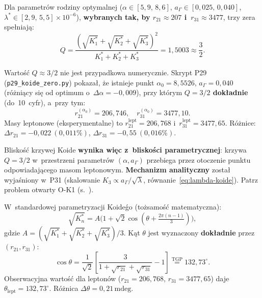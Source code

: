 \begin{hypothesis}%
\label{hyp:koide-tgp}
Dla parametr\'ow rodziny optymalnej
($\alpha \in [5{,}9,\,8{,}6]$, $a_\Gamma \in [0{,}025,\,0{,}040]$,
$\lambda^* \in [2{,}9,\,5{,}5]\!\times\!10^{-6}$),
\textbf{wybranych tak, by $r_{21} \approx 207$ i~$r_{31} \approx 3477$},
trzy zera spe\l{}niaj\k{a}:
\begin{equation}\label{eq:koide-Q}
    Q = \frac{(\sqrt{K^*_1}+\sqrt{K^*_2}+\sqrt{K^*_3})^2}
             {K^*_1+K^*_2+K^*_3}
    = 1{,}5003 \approx \frac{3}{2}.
\end{equation}

\begin{remark}
Warto\'s\'c $Q \approx 3/2$ nie jest przypadkowa numerycznie.
Skrypt P29 (\texttt{p29\_koide\_zero.py}) pokaza\l{}, \.ze
istnieje punkt $\alpha_0 = 8{,}5526$, $a_\Gamma=0{,}040$
(r\'o\.zni\k{a}cy si\k{e} od optimum o~$\Delta\alpha = -0{,}009$),
przy kt\'orym \textbf{$Q = 3/2$ dok\l{}adnie} (do~10~cyfr), a~przy tym:
\begin{equation}\label{eq:r-at-alpha0}
    r_{21}^{(\alpha_0)} = 206{,}746, \quad r_{31}^{(\alpha_0)} = 3477{,}10.
\end{equation}
Masy leptonowe (eksperymentalne) to
$r_{21}^{\mathrm{lept}} = 206{,}768$ i~$r_{31}^{\mathrm{lept}} = 3477{,}65$.
R\'o\.znice: $\Delta r_{21} = -0{,}022\ (0{,}011\%)$,
$\Delta r_{31} = -0{,}55\ (0{,}016\%)$.

Blisko\'s\'c krzywej Koide \textbf{wynika wi\k{e}c z~blisko\'sci
parametrycznej}: krzywa $Q=3/2$ w~przestrzeni parametr\'ow
$(\alpha, a_\Gamma)$ przebiega przez otoczenie punktu
odpowiadaj\k{a}cego masom leptonowym.
\textbf{Mechanizm analityczny} zosta\l{} wyja\'sniony w~P31
(skalowanie $K_3 \propto a_\Gamma/\sqrt{\lambda}$, r\'ownanie~\eqref{eq:lambda-koide}).
Patrz problem otwarty O-K1 (s.~\pageref{oprob:koide}).
\end{remark}

W~standardowej parametryzacji Koide\'go (to\.zsamo\'s\'c matematyczna):
\begin{equation}\label{eq:koide-param}
    \sqrt{K^*_n} = A\bigl(1 + \sqrt{2}\cos(\theta + \tfrac{2\pi(n-1)}{3})\bigr),
\end{equation}
gdzie $A = (\sqrt{K^*_1}+\sqrt{K^*_2}+\sqrt{K^*_3})/3$.
K\k{a}t $\theta$ jest wyznaczony \textbf{dok\l{}adnie} przez $(r_{21}, r_{31})$:
\begin{equation}\label{eq:theta-exact}
    \cos\theta = \frac{1}{\sqrt{2}}
    \left[\frac{3}{1+\sqrt{r_{21}}+\sqrt{r_{31}}} - 1\right]
    \overset{\mathrm{TGP}}{=} 132{,}73^\circ.
\end{equation}
Obserwacyjna warto\'s\'c dla lepton\'ow ($r_{21} = 206{,}768$,
$r_{31} = 3477{,}65$) daje $\theta_\mathrm{lept} = 132{,}73^\circ$.
R\'o\.znica $\Delta\theta = 0{,}21\,\mathrm{mdeg}$.
\end{hypothesis}

